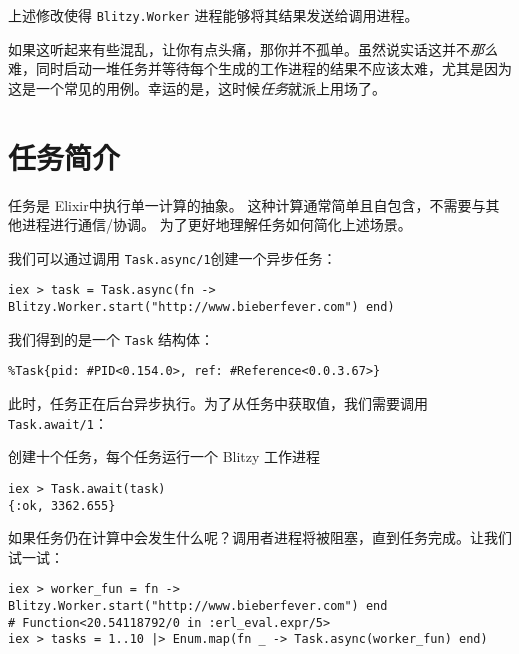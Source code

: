 上述修改使得 \texttt{Blitzy.Worker}
进程能够将其结果发送给调用进程。

如果这听起来有些混乱，让你有点头痛，那你并不孤单。虽然说实话这并不\emph{那么}难，同时启动一堆任务并等待每个生成的工作进程的结果不应该太难，尤其是因为这是一个常见的用例。幸运的是，这时候\emph{任务}就派上用场了。

\section{任务简介}

任务是 Elixir中执行单一计算的抽象。
这种计算通常简单且自包含，不需要与其他进程进行通信/协调。
为了更好地理解任务如何简化上述场景。

我们可以通过调用 \texttt{Task.async/1}创建一个异步任务：

\begin{code}{}\begin{verbatim}
iex > task = Task.async(fn -> Blitzy.Worker.start("http://www.bieberfever.com") end)
\end{verbatim}
\end{code}

我们得到的是一个 \texttt{Task} 结构体：

\begin{code}{}\begin{verbatim}
%Task{pid: #PID<0.154.0>, ref: #Reference<0.0.3.67>}
\end{verbatim}
\end{code}

此时，任务正在后台异步执行。为了从任务中获取值，我们需要调用
\texttt{Task.await/1}：

\begin{code}{创建十个任务，每个任务运行一个 Blitzy 工作进程}

\begin{verbatim}
iex > Task.await(task)
{:ok, 3362.655}
\end{verbatim}
\end{code}

如果任务仍在计算中会发生什么呢？调用者进程将被阻塞，直到任务完成。让我们试一试：

\begin{code}{}
\begin{verbatim}
iex > worker_fun = fn -> Blitzy.Worker.start("http://www.bieberfever.com") end
# Function<20.54118792/0 in :erl_eval.expr/5>
iex > tasks = 1..10 |> Enum.map(fn _ -> Task.async(worker_fun) end)
\end{verbatim}
\end{code}

